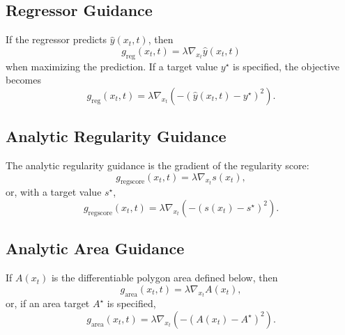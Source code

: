 \documentclass[11pt]{article}
\begin{document}
\subsection{Regressor Guidance}
If the regressor predicts $\hat{y}(x_t,t)$, then
\begin{equation}
g_{\mathrm{reg}}(x_t,t)
=
\lambda \nabla_{x_t} \hat{y}(x_t,t)
\end{equation}
when maximizing the prediction. If a target value $y^\star$ is specified, the objective becomes
\begin{equation}
g_{\mathrm{reg}}(x_t,t)
=
\lambda \nabla_{x_t}
\left(
-\left(\hat{y}(x_t,t) - y^\star\right)^2
\right).
\end{equation}

\subsection{Analytic Regularity Guidance}
The analytic regularity guidance is the gradient of the regularity score:
\begin{equation}
g_{\mathrm{regscore}}(x_t,t)
=
\lambda \nabla_{x_t} s(x_t),
\end{equation}
or, with a target value $s^\star$,
\begin{equation}
g_{\mathrm{regscore}}(x_t,t)
=
\lambda \nabla_{x_t}
\left(
-\left(s(x_t) - s^\star\right)^2
\right).
\end{equation}

\subsection{Analytic Area Guidance}
If $A(x_t)$ is the differentiable polygon area defined below, then
\begin{equation}
g_{\mathrm{area}}(x_t,t)
=
\lambda \nabla_{x_t} A(x_t),
\end{equation}
or, if an area target $A^\star$ is specified,
\begin{equation}
g_{\mathrm{area}}(x_t,t)
=
\lambda \nabla_{x_t}
\left(
-\left(A(x_t) - A^\star\right)^2
\right).
\end{equation}
\end{document}
